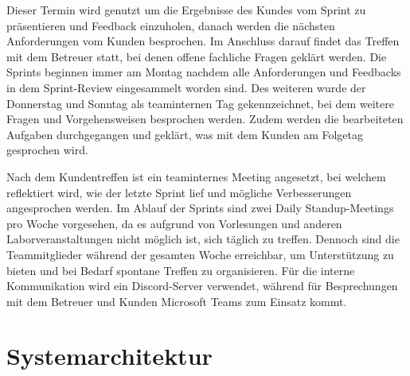 \documentclass[a4paper,12pt]{article}
\begin{document}
Dieser Termin wird genutzt um die Ergebnisse des Kundes vom Sprint zu präsentieren und Feedback einzuholen, danach werden die nächsten Anforderungen vom Kunden besprochen. Im Anschluss darauf findet das Treffen mit dem Betreuer statt, bei denen offene fachliche Fragen geklärt werden.  Die Sprints beginnen immer am Montag nachdem alle Anforderungen und Feedbacks in dem Sprint-Review eingesammelt worden sind. Des weiteren wurde der Donnerstag und Sonntag als teaminternen Tag gekennzeichnet, bei dem weitere Fragen und Vorgehensweisen besprochen werden. Zudem werden die bearbeiteten Aufgaben durchgegangen und geklärt, was mit dem Kunden am Folgetag gesprochen wird. 

Nach dem Kundentreffen ist ein teaminternes Meeting angesetzt, bei welchem reflektiert wird, wie der letzte Sprint lief und mögliche Verbesserungen angesprochen werden. Im Ablauf der Sprints sind zwei Daily Standup-Meetings pro Woche vorgesehen, da es aufgrund von Vorlesungen und anderen Laborveranstaltungen nicht möglich ist, sich täglich zu treffen. Dennoch sind die Teammitglieder während der gesamten Woche erreichbar, um Unterstützung zu bieten und bei Bedarf spontane Treffen zu organisieren. Für die interne Kommunikation wird ein Discord-Server verwendet, während für Besprechungen mit dem Betreuer und Kunden Microsoft Teams zum Einsatz kommt.

\newpage


\section{Systemarchitektur}

\end{document}
